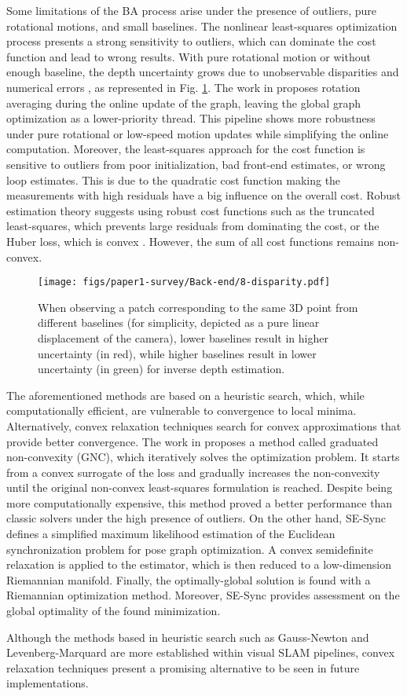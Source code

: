 Some limitations of the \ac{BA} process arise under the presence of outliers, pure rotational motions, and small baselines. The nonlinear least-squares optimization process presents a strong sensitivity to outliers, which can dominate the cost function and lead to wrong results.
With pure rotational motion or without enough baseline, the depth uncertainty grows due to unobservable disparities and numerical errors \cite{hess2014uncertaintyandbaseline}, as represented in Fig. \ref{fig:disparity}. The work in \cite{bustos2019LinfinitySLAM} proposes rotation averaging \cite{eriksson2018rotationaveraging} during the online update of the graph, leaving the global graph optimization as a lower-priority thread. This pipeline shows more robustness under pure rotational or low-speed motion updates while simplifying the online computation.
Moreover, the least-squares approach for the cost function is sensitive to outliers from poor initialization, bad front-end estimates, or wrong loop estimates. This is due to the quadratic cost function making the measurements with high residuals have a big influence on the overall cost. Robust estimation theory suggests using robust cost functions such as the truncated least-squares, which prevents large residuals from dominating the cost, or the Huber loss, which is convex \cite{black1996robustloss}. However, the sum of all cost functions remains non-convex. 

\begin{figure}[thb]

    \centering
    \smallskip
    \texttt{[image: figs/paper1-survey/Back-end/8-disparity.pdf]}

    \caption[How the baseline affects the estimate's uncertainty]{When observing a patch corresponding to the same 3D point from different baselines (for simplicity, depicted as a pure linear displacement of the camera), lower baselines result in higher uncertainty (in red), while higher baselines result in lower uncertainty (in green) for inverse depth estimation.}
    \label{fig:disparity}
\end{figure} 
The aforementioned methods are based on a heuristic search, which, while computationally efficient, are vulnerable to convergence to local minima. Alternatively, convex relaxation techniques search for convex approximations that provide better convergence.
The work in \cite{yangcarlone2020GNC} proposes a method called graduated non-convexity (GNC), which iteratively solves the optimization problem. It starts from a convex surrogate of the loss and gradually increases the non-convexity until the original non-convex least-squares formulation is reached. Despite being more computationally expensive, this method proved a better performance than classic solvers under the high presence of outliers.
On the other hand, SE-Sync \cite{backend:sesyncrosen2019se} defines a simplified maximum likelihood estimation of the Euclidean synchronization problem for pose graph optimization. A convex semidefinite relaxation is applied to the estimator, which is then reduced to a low-dimension Riemannian manifold. Finally, the optimally-global solution is found with a Riemannian optimization method. Moreover, SE-Sync provides assessment on the global optimality of the found minimization.

Although the methods based in heuristic search such as Gauss-Newton and Levenberg-Marquard are more established within visual SLAM pipelines, convex relaxation techniques present a promising alternative to be seen in future implementations.